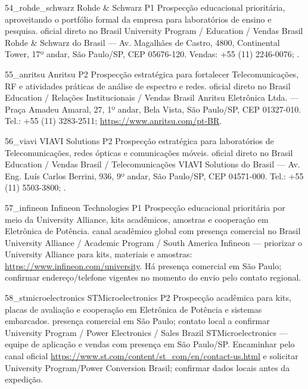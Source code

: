 \ContatoEmpresa
  {54_rohde_schwarz}
  {Rohde \& Schwarz}
  {P1}
  {Prospecção educacional prioritária, aproveitando o portfólio formal da empresa para laboratórios de ensino e pesquisa.}
  {oficial direto no Brasil}
  {University Program / Education / Vendas Brasil}
  {Rohde \& Schwarz do Brasil — Av. Magalhães de Castro, 4800, Continental Tower, 17º andar, São Paulo/SP, CEP 05676-120. Vendas: +55 (11) 2246-0076; .}

\ContatoEmpresa
  {55_anritsu}
  {Anritsu}
  {P2}
  {Prospecção estratégica para fortalecer Telecomunicações, RF e atividades práticas de análise de espectro e redes.}
  {oficial direto no Brasil}
  {Education / Relações Institucionais / Vendas Brasil}
  {Anritsu Eletrônica Ltda. — Praça Amadeu Amaral, 27, 1º andar, Bela Vista, São Paulo/SP, CEP 01327-010. Tel.: +55 (11) 3283-2511; \url{https://www.anritsu.com/pt-BR}.}

\ContatoEmpresa
  {56_viavi}
  {VIAVI Solutions}
  {P2}
  {Prospecção estratégica para laboratórios de Telecomunicações, redes ópticas e comunicações móveis.}
  {oficial direto no Brasil}
  {Education / Vendas Brasil / Telecomunicações}
  {VIAVI Solutions do Brasil — Av. Eng. Luís Carlos Berrini, 936, 9º andar, São Paulo/SP, CEP 04571-000. Tel.: +55 (11) 5503-3800; .}

\ContatoEmpresa
  {57_infineon}
  {Infineon Technologies}
  {P1}
  {Prospecção educacional prioritária por meio da University Alliance, kits acadêmicos, amostras e cooperação em Eletrônica de Potência.}
  {canal acadêmico global com presença comercial no Brasil}
  {University Alliance / Academic Program / South America}
  {Infineon — priorizar o University Alliance para kits, materiais e amostras: \url{https://www.infineon.com/university}. Há presença comercial em São Paulo; confirmar endereço/telefone vigentes no momento do envio pelo contato regional.}

\ContatoEmpresa
  {58_stmicroelectronics}
  {STMicroelectronics}
  {P2}
  {Prospecção acadêmica para kits, placas de avaliação e cooperação em Eletrônica de Potência e sistemas embarcados.}
  {presença comercial em São Paulo; contato local a confirmar}
  {University Program / Power Electronics / Sales Brazil}
  {STMicroelectronics — equipe de aplicação e vendas com presença em São Paulo/SP. Encaminhar pelo canal oficial \url{https://www.st.com/content/st_com/en/contact-us.html} e solicitar University Program/Power Conversion Brasil; confirmar dados locais antes da expedição.}


